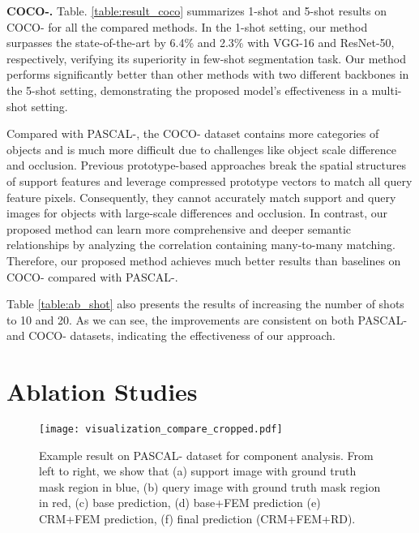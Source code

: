 \documentclass[journal]{IEEEtran}
\begin{document}
\textbf{COCO-.} Table. \ref{table:result_coco} summarizes 1-shot and 5-shot results on COCO- for all the compared methods. In the 1-shot setting, our method surpasses the state-of-the-art by 6.4\% and 2.3\% with VGG-16 and ResNet-50, respectively, verifying its superiority in few-shot segmentation task. Our method performs significantly better than other methods with two different backbones in the 5-shot setting, demonstrating the proposed model's effectiveness in a multi-shot setting.

 {Compared with PASCAL-, the COCO- dataset contains more categories of objects and is much more difficult due to challenges like object scale difference and occlusion. Previous prototype-based approaches break the spatial structures of support features and leverage compressed prototype vectors to match all query feature pixels. Consequently, they cannot accurately match support and query images for objects with large-scale differences and occlusion. In contrast, our proposed method can learn more comprehensive and deeper semantic relationships by analyzing the correlation containing many-to-many matching. Therefore, our proposed method achieves much better results than baselines on COCO- compared with PASCAL-.
}



 {
Table \ref{table:ab_shot} also presents the results of increasing the number of shots to 10 and 20. As we can see, the improvements are consistent on both PASCAL- and COCO- datasets, indicating the effectiveness of our approach.
}

\section{Ablation Studies}
\label{ab_study}

\begin{figure*}[t]
\centering
\texttt{[image:  visualization\_compare\_cropped.pdf]}
\caption{Example result on PASCAL- dataset for component analysis. From left to right, we show that (a) support image with ground truth mask region in blue, (b) query image with ground truth mask region in red,  (c) base prediction, (d) base+FEM prediction (e) CRM+FEM
prediction, (f) final prediction (CRM+FEM+RD).}
\label{fig:ab_module}
\end{figure*}
\end{document}
